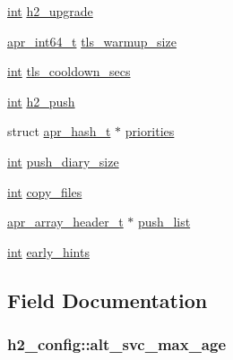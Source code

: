 \begin{DoxyCompactItemize}
\hyperlink{pcre_8txt_a42dfa4ff673c82d8efe7144098fbc198}{int} \hyperlink{structh2__config_a25bf2a5c21d3ae944f511d1c1386bafb}{h2\+\_\+upgrade}
\item 
\hyperlink{group__apr__platform_ga4b75afbf973dc6c8aea4ae75b044aa08}{apr\+\_\+int64\+\_\+t} \hyperlink{structh2__config_a2159a7ccda9c4a728ff1c40d87b50882}{tls\+\_\+warmup\+\_\+size}
\item 
\hyperlink{pcre_8txt_a42dfa4ff673c82d8efe7144098fbc198}{int} \hyperlink{structh2__config_ad6081549e8d22c5b98d97bebea8e159b}{tls\+\_\+cooldown\+\_\+secs}
\item 
\hyperlink{pcre_8txt_a42dfa4ff673c82d8efe7144098fbc198}{int} \hyperlink{structh2__config_a6c6331b93ae6604df03a2088466fafd5}{h2\+\_\+push}
\item 
struct \hyperlink{structapr__hash__t}{apr\+\_\+hash\+\_\+t} $\ast$ \hyperlink{structh2__config_a20b099c5abf34b9cfcbdfcae5cde0557}{priorities}
\item 
\hyperlink{pcre_8txt_a42dfa4ff673c82d8efe7144098fbc198}{int} \hyperlink{structh2__config_ac70f87a0516a9346e8ca51141362bd68}{push\+\_\+diary\+\_\+size}
\item 
\hyperlink{pcre_8txt_a42dfa4ff673c82d8efe7144098fbc198}{int} \hyperlink{structh2__config_a8c01ed87e276cc10aad1f905461a8327}{copy\+\_\+files}
\item 
\hyperlink{structapr__array__header__t}{apr\+\_\+array\+\_\+header\+\_\+t} $\ast$ \hyperlink{structh2__config_a10f91baf5222819068eca9b92572ac93}{push\+\_\+list}
\item 
\hyperlink{pcre_8txt_a42dfa4ff673c82d8efe7144098fbc198}{int} \hyperlink{structh2__config_a15b1ca3f57b72ba057983ee41ab463af}{early\+\_\+hints}
\end{DoxyCompactItemize}


\subsection{Field Documentation}
\subsubsection[{\texorpdfstring{alt\+\_\+svc\+\_\+max\+\_\+age}{alt_svc_max_age}}]{ h2\+\_\+config\+::alt\+\_\+svc\+\_\+max\+\_\+age}\hypertarget{structh2__config_ae9c50db419b0892a8620485d2e3d6fb7}{}\label{structh2__config_ae9c50db419b0892a8620485d2e3d6fb7}

